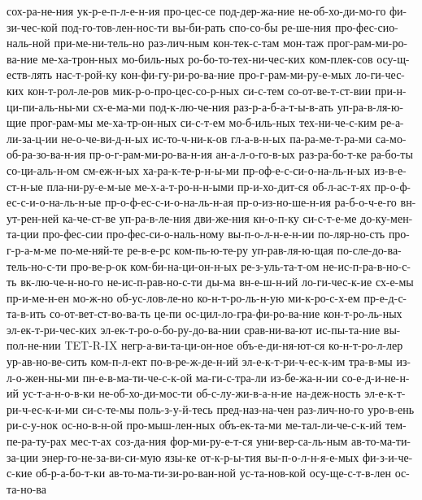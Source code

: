 {    сох-ра-не-ния
    ук-р-е-п-л-е-н-ия
    про-цес-се
    под-дер-жа-ние
    не-об-хо-ди-мо-го
    фи-зи-чес-кой
    под-го-тов-лен-нос-ти
    вы-би-рать
    спо-со-бы
    ре-ше-ния
    про-фес-сио-наль-ной
    при-ме-ни-тель-но
    раз-лич-ным
    кон-тек-с-там
    мон-таж
    прог-рам-ми-ро-ва-ние
    ме-ха-трон-ных
    мо-биль-ных
    ро-бо-то-тех-ни-чес-ких
    ком-плек-сов
    осу-щ-еств-лять
    нас-т-рой-ку
    кон-фи-гу-ри-ро-ва-ние
    про-г-рам-ми-ру-е-мых
    ло-ги-чес-ких
    кон-т-рол-ле-ров
    мик-р-о-про-цес-со-р-ных
    си-с-тем
    со-от-ве-т-ст-вии
    при-н-ци-пи-аль-ны-ми
    сх-е-ма-ми
    под-к-лю-че-ния
    раз-р-а-б-а-т-ы-в-ать
    уп-ра-в-ля-ю-щие
    прог-рам-мы
    ме-ха-тр-он-ных
    си-с-т-ем
    мо-б-иль-ных
    тех-ни-че-с-ким
    ре-а-ли-за-ц-ии
    не-о-че-ви-д-н-ых
    ис-то-ч-ни-к-ов
    гл-а-в-н-ых
    па-ра-ме-т-ра-ми
    са-мо-об-ра-зо-ва-н-ия
    пр-о-г-рам-ми-ро-ва-н-ия
    ан-а-л-о-го-в-ых
    раз-ра-бо-т-ке
    ра-бо-ты
    со-ци-аль-н-ом
    см-еж-н-ых
    ха-ра-к-те-р-н-ы-ми
    пр-оф-е-с-си-о-на-ль-н-ых
    из-в-е-ст-н-ые
    пла-ни-ру-е-м-ые
    ме-х-а-т-ро-н-н-ыми
    пр-и-хо-дит-ся
    об-л-ас-т-ях
    пр-о-ф-ес-с-и-о-на-ль-н-ые
    пр-о-ф-ес-с-и-о-на-ль-н-ая
    пр-о-из-но-ше-н-ия
    ра-б-о-ч-е-го
    вн-ут-рен-ней
    ка-че-ст-ве
    уп-ра-в-ле-ния
    дви-же-ния
    кн-о-п-ку
    си-с-т-е-ме
    до-ку-мен-та-ции
    про-фес-сии
    про-фес-си-о-наль-ному
    вы-п-о-л-н-е-н-ии
    по-ляр-но-сть
    про-г-р-а-м-ме
    по-ме-няй-те
    ре-в-е-рс
    ком-пь-ю-те-ру
    уп-рав-ля-ю-щая
    по-сле-до-ва-тель-но-с-ти
    про-ве-р-ок
    ком-би-на-ци-он-н-ых
    ре-з-уль-та-т-ом
    не-ис-п-ра-в-но-с-ть
    вк-лю-че-н-но-го
    не-ис-п-рав-но-с-ти
    ды-ма
    вн-е-ш-н-ий
    ло-ги-чес-к-ие
    сх-е-мы
    пр-и-ме-н-ен
    мо-ж-но
    об-ус-лов-ле-но
    ко-н-т-ро-ль-н-ую
    ми-к-ро-с-х-ем
    пр-е-д-с-та-в-ить
    со-от-вет-ст-во-ва-ть
    це-пи
    ос-цил-ло-гра-фи-ро-ва-ние
    кон-т-ро-ль-ных
    эл-ек-т-ри-чес-ких
    эл-ек-т-ро-о-бо-ру-до-ва-нии
    срав-ни-ва-ют
    ис-пы-та-ние
    вы-пол-не-нии
    TET-R-IX
    негр-а-ви-та-ци-он-ное
    объ-е-ди-ня-ют-ся
    ко-н-т-ро-л-лер
    ур-ав-но-ве-сить
    ком-п-л-ект
    по-в-ре-ж-де-н-ий
    эл-е-к-т-ри-ч-ес-к-им
    тра-в-мы
    из-л-о-жен-ны-ми
    пн-е-в-ма-ти-че-с-к-ой
    ма-ги-с-тра-ли
    из-бе-жа-н-ии
    со-е-д-и-не-н-ий
    ус-т-а-н-о-в-ки
    не-об-хо-ди-мос-ти
    об-с-лу-жи-в-а-н-ие
    на-деж-ность
    эл-е-к-т-ри-ч-ес-к-и-ми
    си-с-те-мы
    поль-з-у-й-тесь
    пред-наз-на-чен
    раз-лич-но-го
    уро-в-ень
    ри-с-у-нок
    ос-но-в-н-ой
    про-мыш-лен-ных
    объ-ек-та-ми
    ме-тал-ли-че-с-к-ий
    тем-пе-ра-ту-рах
    мес-т-ах
    соз-да-ния
    фор-ми-ру-е-т-ся
    уни-вер-са-ль-ным
    ав-то-ма-ти-за-ции
    энер-го-не-за-ви-си-мую
    язы-ке
    от-к-р-ы-тия
    вы-п-о-л-н-я-е-мых
    фи-з-и-че-с-кие
    об-р-а-бо-т-ки
    ав-то-ма-ти-зи-ро-ван-ной
    ус-та-нов-кой
    осу-ще-с-т-в-лен
    ос-та-но-ва
    }